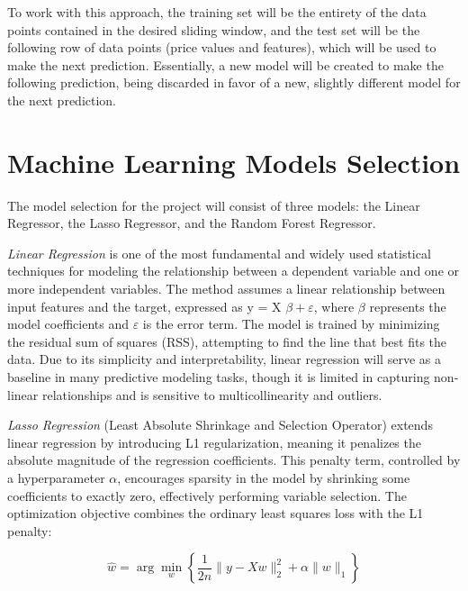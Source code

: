 \documentclass[12pt]{report} %
\begin{document}
To work with this approach, the training set will be the entirety of the data points contained in the desired sliding window, and the test set will be the following row of data points (price values and features), which will be used to make the next prediction. Essentially, a new model will be created to make the following prediction, being discarded in favor of a new, slightly different model for the next prediction.


\section{Machine Learning Models Selection}

The model selection for the project will consist of three models: the Linear Regressor, the Lasso Regressor, and the Random Forest Regressor.

\textit{Linear Regression} \cite{linear_regression} is one of the most fundamental and widely used statistical techniques for modeling the relationship between a dependent variable and one or more independent variables. The method assumes a linear relationship between input features and the target, expressed as y = X $\beta + \varepsilon $, where $\beta$ represents the model coefficients and $\varepsilon$ is the error term. The model is trained by minimizing the residual sum of squares (RSS), attempting to find the line that best fits the data. Due to its simplicity and interpretability, linear regression will serve as a baseline in many predictive modeling tasks, though it is limited in capturing non-linear relationships and is sensitive to multicollinearity and outliers.


\textit{Lasso Regression} \cite{lasso_regression} (Least Absolute Shrinkage and Selection Operator) extends linear regression by introducing L1 regularization, meaning it penalizes the absolute magnitude of the regression coefficients. This penalty term, controlled by a hyperparameter $\alpha$, encourages sparsity in the model by shrinking some coefficients to exactly zero, effectively performing variable selection. The optimization objective combines the ordinary least squares loss with the L1 penalty:

\begin{equation}
\hat{w} = \arg\min_{w} \left\{ \frac{1}{2n} \| y - Xw \|_2^2 + \alpha \| w \|_1 \right\}
\end{equation}
\end{document}
